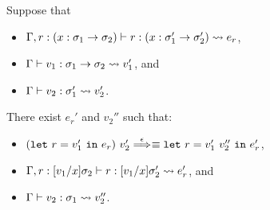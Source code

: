 \begin{lemma}
\label{lem:coerce}
Suppose that
\begin{itemize}
\item \(\Gamma,r:(x:\sigma_1 \to \sigma_2) \vdash r : (x:\sigma_1' \to \sigma_2') \leadsto e_r\),
\item \(\Gamma \vdash v_1 : \sigma_1 \to \sigma_2 \leadsto v_1'\), and
\item \(\Gamma \vdash v_2 : \sigma_1' \leadsto v_2'\).
\end{itemize}
There exist \(e_r'\) and \(v_2''\) such that:
\begin{itemize}
\item \((\LETEQIN{r}{v_1'}{e_r})\ v_2' \redswith{\epsilon}{}\equiv \LETEQIN{r}{v_1'\ v_2''}e_r'\),
\item \(\Gamma,r:[v_1/x]\sigma_2 \vdash r : [v_1/x]\sigma_2' \leadsto e_r'\), and
\item \(\Gamma \vdash v_2 : \sigma_1 \leadsto v_2''\).
\end{itemize}
\end{lemma}
